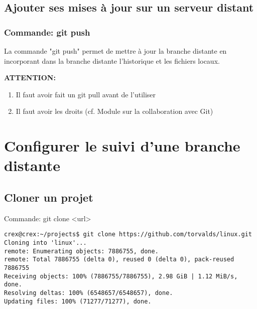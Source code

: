 \documentclass{beamer}
\begin{document}
\subsection{Ajouter ses mises à jour sur un serveur distant}
\begin{frame}
\frametitle{Commande: git push}
La commande "git push" permet de mettre à jour la branche distante en incorporant dans la branche distante l'historique et les fichiers locaux.
\bigskip

\textbf{ATTENTION:} 
\begin{enumerate}
    \item Il faut avoir fait un git pull avant de l'utiliser
    \item Il faut avoir les droits (cf. Module sur la collaboration avec Git)
\end{enumerate}
\end{frame}



\section{Configurer le suivi d'une branche distante}

\subsection{Cloner un projet}
\begin{frame}[fragile]{Commande: git clone <url>}
\begin{mdframed}[style=Bash]
    \begin{lstlisting}[style=Bash, caption={Exemple de git clone}]
crex@crex:~/projects$ git clone https://github.com/torvalds/linux.git
Cloning into 'linux'...
remote: Enumerating objects: 7886755, done.
remote: Total 7886755 (delta 0), reused 0 (delta 0), pack-reused 7886755
Receiving objects: 100% (7886755/7886755), 2.98 GiB | 1.12 MiB/s, done.
Resolving deltas: 100% (6548657/6548657), done.
Updating files: 100% (71277/71277), done.
    \end{lstlisting}
    \end{mdframed}
\end{frame}
\end{document}
